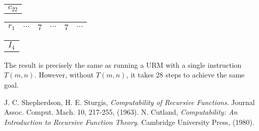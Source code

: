 \documentclass[12pt]{article}
\begin{document}
\vspace{-0.75cm}
\begin{center}
\begin{tabular}{ p{0.5cm} }
$c_{22}$
\end{tabular}
\begin{tabular}{|c|c|c|c|c|c}
\hline
$r_1$ & $\cdots$ & $7$ & $\cdots$ & $7$ & $\cdots$ \\
\hline
\end{tabular}
\begin{tabular}{ p{0.5cm} }
$I_4$
\end{tabular}
\end{center}

The result is precisely the same as running a URM with a single instruction $T(m,n)$.  However, without $T(m,n)$, it takes 28 steps to achieve the same goal.

\begin{thebibliography}{9}
 J. C. Shepherdson, H. E. Sturgis, {\em Computability of Recursive Functions}. Journal Assoc. Comput. Mach. 10, 217-255, (1963).
 N. Cutland, {\em Computability: An Introduction to Recursive Function Theory}. Cambridge University Press, (1980).
\end{thebibliography}
\end{document}
